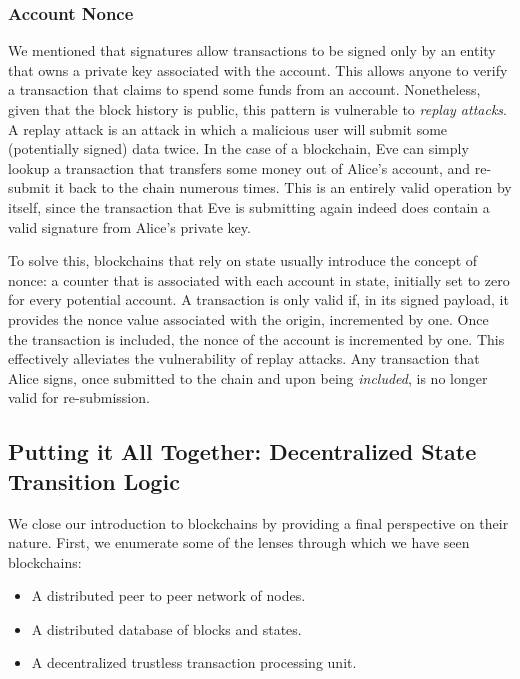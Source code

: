 \subsubsection{Account Nonce} \label{chap_bg:subsec:nonce}

We mentioned that signatures allow transactions to be signed only by an entity that owns a private
key associated with the account. This allows anyone to verify a transaction that claims to spend
some funds from an account. Nonetheless, given that the block history is public, this pattern is
vulnerable to \textit{replay attacks}. A replay attack is an attack in which a malicious user will
submit some (potentially signed) data twice. In the case of a blockchain, Eve can simply lookup a
transaction that transfers some money out of Alice's account, and re-submit it back to the chain
numerous times. This is an entirely valid operation by itself, since the transaction that Eve is
submitting again indeed does contain a valid signature from Alice's private key.

To solve this, blockchains that rely on state usually introduce the concept of nonce: a counter that
is associated with each account in state, initially set to zero for every potential account. A
transaction is only valid if, in its signed payload, it provides the nonce value associated with the
origin, incremented by one. Once the transaction is included, the nonce of the account is
incremented by one. This effectively alleviates the vulnerability of replay attacks. Any transaction
that Alice signs, once submitted to the chain and upon being \textit{included}, is no longer valid
for re-submission.

\subsection{Putting it All Together: Decentralized State Transition Logic}
\label{chap_bg:subsec:decentralized_state_machine}

We close our introduction to blockchains by providing a final perspective on their nature. First, we
enumerate some of the lenses through which we have seen blockchains:

\begin{itemize}
	\item A distributed peer to peer network of nodes.
	\item A distributed database of blocks and states.
	\item A decentralized trustless transaction processing unit.
\end{itemize}

